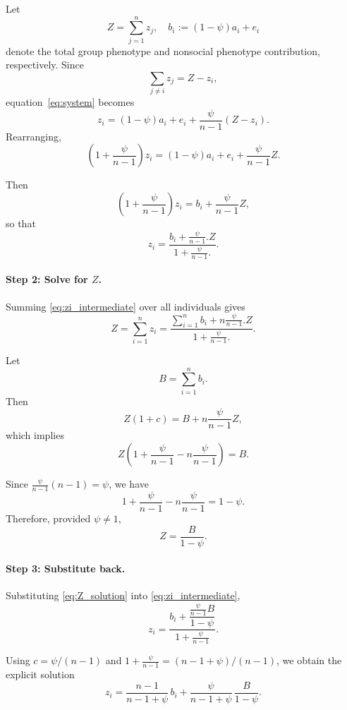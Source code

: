 Let
\[
Z = \sum_{j=1}^n z_j, \quad b_i := (1-\psi)a_i + e_i
\]
denote the total group phenotype and nonsocial phenotype contribution, respectively. Since
\[
\sum_{j \ne i} z_j = Z - z_i,
\]
equation~\eqref{eq:system} becomes
\begin{equation}
z_i = (1-\psi)a_i + e_i + \frac{\psi}{n-1}(Z - z_i).
\end{equation}
Rearranging,
\[
\left(1 + \frac{\psi}{n-1}\right) z_i
= (1-\psi)a_i + e_i + \frac{\psi}{n-1} Z.
\]

Then
\begin{equation}
(1+\frac{\psi}{n-1}) z_i = b_i + \frac{\psi}{n-1} Z,
\end{equation}
so that
\begin{equation}
z_i = \frac{b_i + \frac{\psi}{n-1}.Z}{1+\frac{\psi}{n-1}.}.
\label{eq:zi_intermediate}
\end{equation}

\paragraph{Step 2: Solve for $Z$.}

Summing \eqref{eq:zi_intermediate} over all individuals gives
\[
Z = \sum_{i=1}^n z_i
= \frac{\sum_{i=1}^n b_i + n\frac{\psi}{n-1}.Z}{1+\frac{\psi}{n-1}.}.
\]

Let
\[
B = \sum_{i=1}^n b_i.
\]
Then
\[
Z(1+c) = B + n\frac{\psi}{n-1}Z,
\]
which implies
\[
Z(1 + \frac{\psi}{n-1} - n\frac{\psi}{n-1}) = B.
\]

Since $\frac{\psi}{n-1}(n-1) = \psi$, we have
\[
1 + \frac{\psi}{n-1} - n\frac{\psi}{n-1} = 1 - \psi.
\]
Therefore, provided $\psi \ne 1$,
\begin{equation}
Z = \frac{B}{1-\psi}.
\label{eq:Z_solution}
\end{equation}

\paragraph{Step 3: Substitute back.}

Substituting \eqref{eq:Z_solution} into \eqref{eq:zi_intermediate},
\[
z_i = \frac{b_i + \dfrac{\frac{\psi}{n-1}B}{1-\psi}}{1+\frac{\psi}{n-1}}.
\]

Using $c = \psi/(n-1)$ and $1+\frac{\psi}{n-1} = (n-1+\psi)/(n-1)$, we obtain the explicit solution
\begin{equation}
z_i
=
\frac{n-1}{n-1+\psi}\, b_i
+
\frac{\psi}{n-1+\psi}\,
\frac{B}{1-\psi}.
\end{equation}

